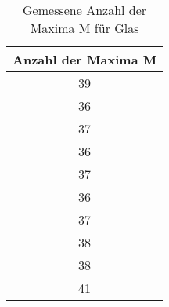 \begin{table}[H] 
    \centering 
    \caption{Gemessene Anzahl der Maxima M für Glas } 
    \label{tab:M} 
    \begin{tabular} { c } 
  \toprule 
  {Anzahl der Maxima M} \\ 
     \midrule 
     39 \\
     36 \\
     37 \\
     36 \\
     37 \\
     36 \\
     37 \\
     38 \\
     38 \\
     41 \\ 
     \bottomrule 
   \end{tabular}
 \end{table}